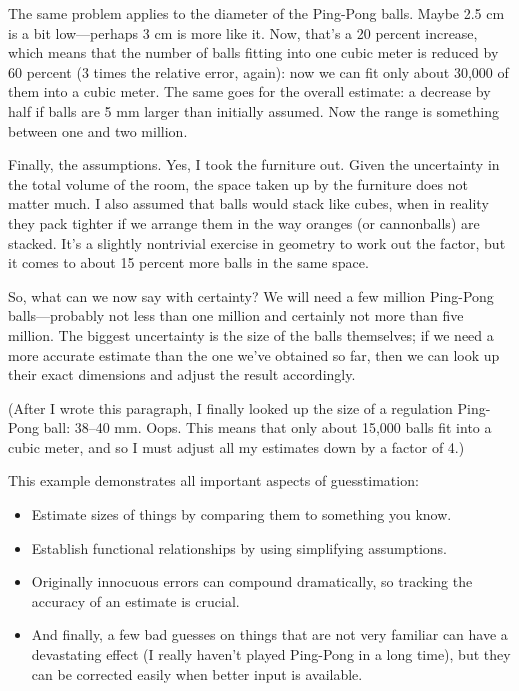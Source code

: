 The same problem applies to the diameter of the Ping-Pong balls.
Maybe 2.5 cm is a bit low---perhaps 3 cm is more like it. Now, that's
a 20 percent increase, which means that the number of balls fitting
into one cubic meter is reduced by 60 percent (3 times the relative
error, again): now we can fit only about 30,000 of them into a cubic
meter.  The same goes for the overall estimate: a decrease by half if
balls are 5 mm larger than initially assumed. Now the range is
something between one and two million.

Finally, the assumptions. Yes, I took the furniture out. Given the
uncertainty in the total volume of the room, the space taken up by the
furniture does not matter much. I also assumed that balls would stack
like cubes, when in reality they pack tighter if we arrange them in
the way oranges (or cannonballs) are stacked. It's a slightly
nontrivial exercise in geometry to work out the factor, but it comes
to about 15 percent more balls in the same space.
    
So, what can we now say with certainty? We will need a few million
Ping-Pong balls---probably not less than one million and certainly not
more than five million. The biggest uncertainty is the size of the
balls themselves; if we need a more accurate estimate than the one
we've obtained so far, then we can look up their exact dimensions and
adjust the result accordingly.
    
(After I wrote this paragraph, I finally looked up the size of a
regulation Ping-Pong ball: 38--40 mm. Oops. This means that only about
15,000 balls fit into a cubic meter, and so I must adjust all my
estimates down by a factor of 4.)
    
This example demonstrates all important aspects of guesstimation:

\begin{itemize}
\item Estimate sizes of things by comparing them to something you
  know.
\item Establish functional relationships by using simplifying
  assumptions.
\item Originally innocuous errors can compound dramatically, so
  tracking the accuracy of an estimate is crucial.
\item And finally, a few bad guesses on things that are not very
  familiar can have a devastating effect (I really haven't played
  Ping-Pong in a long time), but they can be corrected easily when
  better input is available.
\end{itemize}
    
